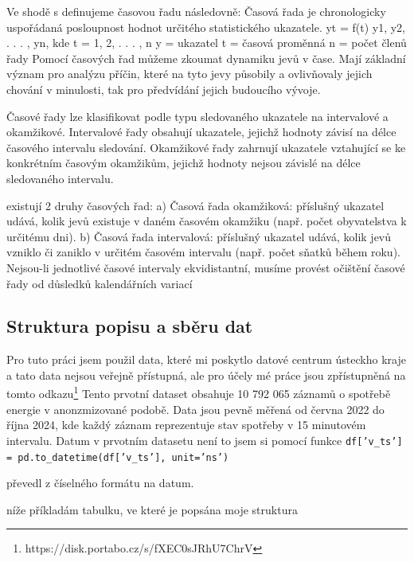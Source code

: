 Ve shodě s \cite{Dobrovolny2006} definujeme časovou řadu následovně: Časová řada je chronologicky uspořádaná posloupnost hodnot určitého statistického ukazatele.
yt = f(t)
y1, y2, . . . , yn, kde t = 1, 2, . . . , n
y = ukazatel
t = časová proměnná
n = počet členů řady
Pomocí časových řad můžeme zkoumat dynamiku jevů v čase. Mají základní význam pro analýzu
příčin, které na tyto jevy působily a ovlivňovaly jejich chování v minulosti, tak pro předvídání jejich
budoucího vývoje.\cite{Dobrovolny2006}

Časové řady lze klasifikovat podle typu sledovaného ukazatele na intervalové a okamžikové. Intervalové řady obsahují ukazatele, jejichž hodnoty závisí na délce časového intervalu sledování. Okamžikové řady zahrnují ukazatele vztahující se ke konkrétním časovým okamžikům, jejichž hodnoty nejsou závislé na délce sledovaného intervalu. 

existují 2 druhy časových řad:
a) Časová řada okamžiková: příslušný ukazatel udává, kolik jevů existuje v daném časovém okamžiku (např. počet obyvatelstva k určitému dni). 
b) Časová řada intervalová: příslušný ukazatel udává, kolik jevů vzniklo či zaniklo v určitém časovém intervalu (např. počet sňatků během roku). Nejsou-li jednotlivé časové intervaly ekvidistantní, musíme provést očištění časové řady od důsledků kalendářních variací
\cite{Arlt2007}



\subsection{Struktura popisu a sběru dat}
Pro tuto práci jsem použil data, které mi poskytlo datové centrum ústeckho kraje a tato data nejsou veřejně přístupná, ale pro účely mé práce jsou  zpřístupněná na tomto odkazu\footnote{https://disk.portabo.cz/s/fXEC0sJRhU7ChrV} 
Tento prvotní dataset obsahuje  10 792 065 záznamů o spotřebě energie v anonzmizované podobě. Data jsou pevně měřená od června 2022 do října 2024, kde každý záznam reprezentuje stav spotřeby v 15 minutovém intervalu. 
Datum v prvotním datasetu není to jsem si pomocí funkce 
\texttt{df['v\_ts'] = pd.to\_datetime(df['v\_ts'], unit='ns')}

převedl z číselného formátu na datum.

níže příkladám tabulku, ve které je popsána moje struktura 

